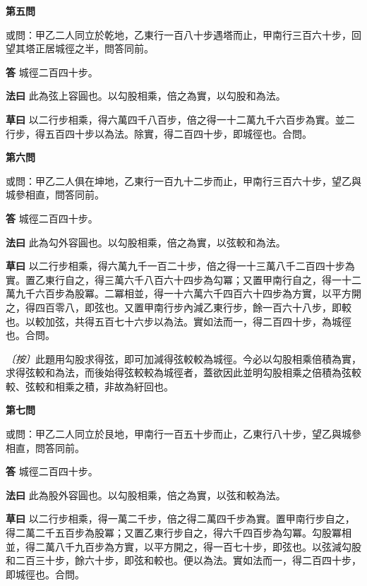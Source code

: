 \documentclass[11pt,a4paper]{article}
\newcommand{\problem}[1]{\par\noindent\textbf{\color{problemcolor}#1}\par\nopagebreak}
\newcommand{\answer}[1]{\par\noindent\textbf{答} #1\par}
\newcommand{\method}[1]{\par\noindent\textbf{法曰} #1\par}
\newcommand{\workings}[1]{\par\noindent\textbf{草曰} #1\par}
\newcommand{\remark}[1]{\par\noindent\textit{〔按〕}#1\par}
\begin{document}
\vspace{0.5cm}

\problem{第五問}

\noindent 或問：甲乙二人同立於乾地，乙東行一百八十步遇塔而止，甲南行三百六十步，回望其塔正居城徑之半，問答同前。

\answer{城徑二百四十步。}

\method{此為弦上容圓也。以勾股相乘，倍之為實，以勾股和為法。}

\workings{以二行步相乘，得六萬四千八百步，倍之得一十二萬九千六百步為實。並二行步，得五百四十步以為法。除實，得二百四十步，即城徑也。合問。}

\vspace{0.5cm}

\problem{第六問}

\noindent 或問：甲乙二人俱在坤地，乙東行一百九十二步而止，甲南行三百六十步，望乙與城參相直，問答同前。

\answer{城徑二百四十步。}

\method{此為勾外容圓也。以勾股相乘，倍之為實，以弦較和為法。}

\workings{以二行步相乘，得六萬九千一百二十步，倍之得一十三萬八千二百四十步為實。置乙東行自之，得三萬六千八百六十四步為勾冪；又置甲南行自之，得一十二萬九千六百步為股冪。二冪相並，得一十六萬六千四百六十四步為方實，以平方開之，得四百零八，即弦也。又置甲南行步內減乙東行步，餘一百六十八步，即較也。以較加弦，共得五百七十六步以為法。實如法而一，得二百四十步，為城徑也。合問。}

\remark{此題用勾股求得弦，即可加減得弦較較為城徑。今必以勾股相乘倍積為實，求得弦較和為法，而後始得弦較較為城徑者，蓋欲因此並明勾股相乘之倍積為弦較較、弦較和相乘之積，非故為紆回也。}

\vspace{0.5cm}

\problem{第七問}

\noindent 或問：甲乙二人同立於艮地，甲南行一百五十步而止，乙東行八十步，望乙與城參相直，問答同前。

\answer{城徑二百四十步。}

\method{此為股外容圓也。以勾股相乘，倍之為實，以弦和較為法。}

\workings{以二行步相乘，得一萬二千步，倍之得二萬四千步為實。置甲南行步自之，得二萬二千五百步為股冪；又置乙東行步自之，得六千四百步為勾冪。勾股冪相並，得二萬八千九百步為方實，以平方開之，得一百七十步，即弦也。以弦減勾股和二百三十步，餘六十步，即弦和較也。便以為法。實如法而一，得二百四十步，即城徑也。合問。}
\end{document}
